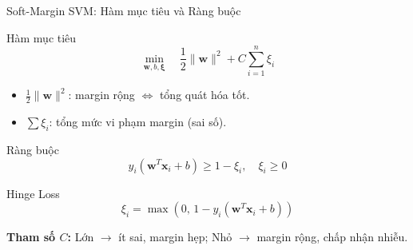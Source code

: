 \begin{frame}{Soft-Margin SVM: Hàm mục tiêu và Ràng buộc}
  \begin{exampleblock}{Hàm mục tiêu}
    \[
    \min_{\mathbf{w}, b, \bm{\xi}} \quad \frac{1}{2}\|\mathbf{w}\|^2 + C \sum_{i=1}^n \xi_i
    \]
    \vspace{-0.3cm}
    \begin{itemize}
      \item $\frac{1}{2}\|\mathbf{w}\|^2$: margin rộng $\Leftrightarrow$ tổng quát hóa tốt.
      \item $\sum \xi_i$: tổng mức vi phạm margin (sai số).
    \end{itemize}
  \end{exampleblock}

  \begin{block}{Ràng buộc}
    \[
    y_i(\mathbf{w}^T \mathbf{x}_i + b) \ge 1 - \xi_i, \quad \xi_i \ge 0
    \]
  \end{block}

  \begin{alertblock}{Hinge Loss}
    $$\xi_i = \max(0,\, 1 - y_i(\mathbf{w}^T \mathbf{x}_i + b))$$
  \end{alertblock}

  \textbf{Tham số $C$:} Lớn $\rightarrow$ ít sai, margin hẹp; Nhỏ $\rightarrow$ margin rộng, chấp nhận nhiễu.
\end{frame}